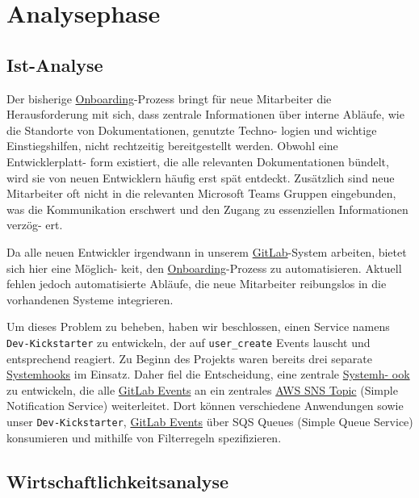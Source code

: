 
\section{Analysephase}
\label{sec:Analysephase}

\subsection{Ist-Analyse}
\label{sec:IstAnalyse}

Der bisherige \hyperlink{Onboarding}{\textcolor{AOBlau}{Onboarding}}-Prozess bringt für neue Mitarbeiter die Herausforderung mit sich, dass zentrale Informationen über interne Abläufe, wie die Standorte von Dokumentationen, genutzte Techno-
logien und wichtige Einstiegshilfen, nicht rechtzeitig bereitgestellt werden. Obwohl eine Entwicklerplatt-
form existiert, die alle relevanten Dokumentationen bündelt, wird sie von neuen Entwicklern häufig erst spät entdeckt. Zusätzlich sind neue Mitarbeiter oft nicht in die relevanten Microsoft Teams Gruppen eingebunden, was die Kommunikation erschwert und den Zugang zu essenziellen Informationen verzög-
ert.

Da alle neuen Entwickler irgendwann in unserem \hyperlink{GitLab}{\textcolor{AOBlau}{GitLab}}-System arbeiten, bietet sich hier eine Möglich-
keit, den \hyperlink{Onboarding}{\textcolor{AOBlau}{Onboarding}}-Prozess zu automatisieren. Aktuell fehlen jedoch automatisierte Abläufe, die neue Mitarbeiter reibungslos in die vorhandenen Systeme integrieren.

Um dieses Problem zu beheben, haben wir beschlossen, einen Service namens \texttt{Dev-Kickstarter} zu entwickeln, der auf \texttt{user\_create} Events lauscht und entsprechend reagiert. Zu Beginn des Projekts waren bereits drei separate \hyperlink{GitLabSystemhooks}{\textcolor{AOBlau}{Systemhooks}} im Einsatz. Daher fiel die Entscheidung, eine zentrale \hyperlink{GitLabSystemhooks}{\textcolor{AOBlau}{Systemh-
ook}} zu entwickeln, die alle \hyperlink{GitLabEvent}{\textcolor{AOBlau}{GitLab Events}} an ein zentrales \hyperlink{SNS}{\textcolor{AOBlau}{AWS SNS Topic}} (Simple Notification Service) weiterleitet. Dort können verschiedene Anwendungen sowie unser \texttt{Dev-Kickstarter}, \hyperlink{GitLabEvent}{\textcolor{AOBlau}{GitLab Events}} über SQS Queues (Simple Queue Service) konsumieren und mithilfe von Filterregeln spezifizieren.



\subsection{Wirtschaftlichkeitsanalyse}
\label{sec:Wirtschaftlichkeitsanalyse}

